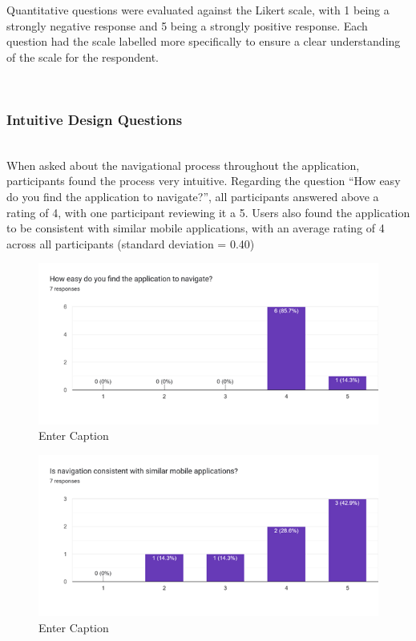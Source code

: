 \documentclass{l4proj}
\begin{document}
Quantitative questions were evaluated against the Likert scale, with 1 being a strongly negative response and 5 being a strongly positive response. Each question had the scale labelled more specifically to ensure a clear understanding of the scale for the respondent.

\noindent\mbox{}\\
\subsubsection{Intuitive Design Questions}
\noindent\mbox{}\\

When asked about the navigational process throughout the application, participants found the process very intuitive. Regarding the question “How easy do you find the application to navigate?”, all participants answered above a rating of 4, with one participant reviewing it a 5. Users also found the application to be consistent with similar mobile applications, with an average rating of 4 across all participants (standard deviation = 0.40)

\begin{figure}[h!]
    \centering
    \includegraphics[width=0.75\linewidth]{dissertation//dissImages/NavigationEasy.png}
    \caption{Enter Caption}
    \label{fig:enter-label}
\end{figure}

\begin{figure}[h!]
    \centering
    \includegraphics[width=0.75\linewidth]{dissertation//dissImages/NavigationConsistency.png}
    \caption{Enter Caption}
    \label{fig:enter-label}
\end{figure}
\end{document}
